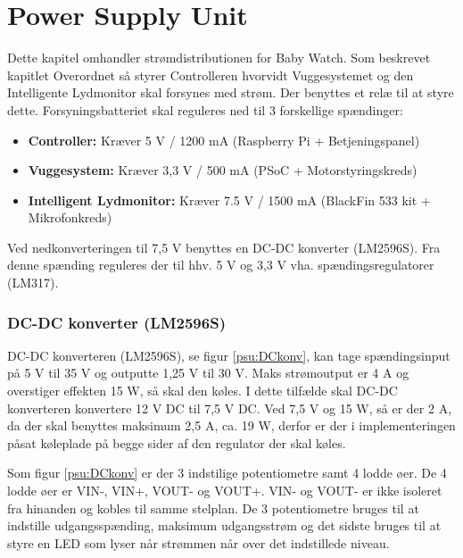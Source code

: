\chapter{Power Supply Unit}

Dette kapitel omhandler strømdistributionen for Baby Watch. Som beskrevet kapitlet Overordnet så styrer Controlleren hvorvidt Vuggesystemet og den Intelligente Lydmonitor skal forsynes med strøm. Der benyttes et relæ til at styre dette. Forsyningsbatteriet skal reguleres ned til 3 forskellige spændinger:

\begin{itemize}
\item \textbf{Controller:} Kræver 5 V / 1200 mA (Raspberry Pi + Betjeningspanel)

\item \textbf{Vuggesystem:} Kræver 3,3 V / 500 mA (PSoC + Motorstyringskreds)

\item \textbf{Intelligent Lydmonitor:} Kræver 7.5 V / 1500 mA (BlackFin 533 kit + Mikrofonkreds)
\end{itemize}

Ved nedkonverteringen til 7,5 V benyttes en DC-DC konverter (LM2596S). Fra denne spænding reguleres der til hhv. 5 V og 3,3 V vha. spændingsregulatorer (LM317). 


\subsection{DC-DC konverter (LM2596S)}

DC-DC konverteren (LM2596S), se figur \ref{psu:DCkonv}, kan tage spændingsinput på 5 V til 35 V og outputte 1,25 V til 30 V. Maks strømoutput er 4 A og overstiger effekten 15 W, så skal den køles. I dette tilfælde skal DC-DC konverteren konvertere 12 V DC til 7,5 V DC. Ved 7,5 V og 15 W, så er der 2 A, da der skal benyttes maksimum 2,5 A, ca. 19 W, derfor er der i implementeringen påsat køleplade på begge sider af den regulator der skal køles. 


Som figur \ref{psu:DCkonv} er der 3 indstilige potentiometre samt 4 lodde øer. De 4 lodde øer er VIN-, VIN+, VOUT- og VOUT+. VIN- og VOUT- er ikke isoleret fra hinanden og kobles til samme stelplan. De 3 potentiometre bruges til at indstille udgangsspænding, maksimum udgangsstrøm og det sidste bruges til at styre en LED som lyser når strømmen når over det indstillede niveau. 

